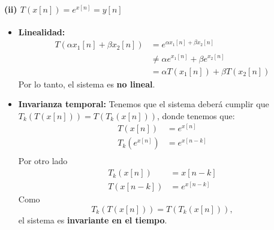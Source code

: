 \documentclass[
  11pt,
  letterpaper,
   addpoints,
  ]{exam}
\begin{document}
\begin{questions}
\begin{solution}
  \paragraph{(ii) $T(x[n]) = e^{x[n]} = y[n]$}
\begin{itemize}
  \item \textbf{Linealidad:}
  \begin{align}
  T(\alpha x_1[n] + \beta x_2[n]) &= e^{\alpha x_1[n] + \beta x_2[n]} \\
  &\neq \alpha e^{x_1[n]} + \beta e^{x_2[n]} \\
  &= \alpha T(x_1[n]) + \beta T(x_2[n])
  \end{align}
  Por lo tanto, el sistema es \textbf{no lineal}.
  \item \textbf{Invarianza temporal:}
  Tenemos que el sistema deberá cumplir que $T_{k}(T(x[n])) = T(T_{k}(x[n]))$, donde tenemos que:
  \begin{align}
  T(x[n]) &= e^{x[n]} \\
  T_k(e^{x[n]}) &= e^{x[n-k]} \\
  \end{align}
  Por otro lado
  \begin{align}
  T_k(x[n]) &= x[n-k]\\
  T(x[n-k]) &= e^{x[n-k]}
  \end{align}
  Como
  \begin{equation}
  T_k(T(x[n])) = T(T_k(x[n])),
  \end{equation}
  el sistema es \textbf{invariante en el tiempo}.
\end{itemize}


\end{solution}
\end{questions}
\end{document}
